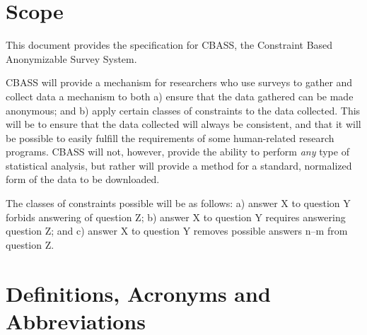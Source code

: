 \documentclass[10pt,letter]{report}
\begin{document}
\section{Scope}
\label{sec:scope}

This document provides the specification for CBASS, the Constraint
Based Anonymizable Survey System.

CBASS will provide a mechanism for researchers who use surveys to gather
and collect data a mechanism to both a) ensure that the data gathered
can be made anonymous; and b) apply certain classes of constraints to
the data collected.  This will be to ensure that the data collected will
always be consistent, and that it will be possible to easily fulfill
the requirements of some human-related research programs.  CBASS will
not, however, provide the ability to perform \emph{any} type of
statistical analysis, but rather will provide a method for a standard,
normalized form of the data to be downloaded.

The classes of constraints possible will be as follows: a) answer X to
question Y forbids answering of question Z; b) answer X to question Y
requires answering question Z; and c) answer X to question Y removes
possible answers n--m from question Z.

\section{Definitions, Acronyms and Abbreviations}
\label{sec:defin-acronyms-abbr}
\end{document}
